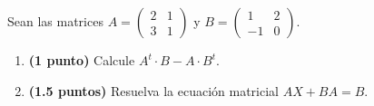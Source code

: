 
Sean las matrices $A=\begin{pmatrix}2&1\\3&1\end{pmatrix}$ y $B=\begin{pmatrix}1&2\\-1&0\end{pmatrix}$.
\begin{enumerate}[label=\alph*)]
\item \textbf{(1 punto)} Calcule $A^t\cdot B-A\cdot B^t$.
\item \textbf{(1.5 puntos)} Resuelva la ecuación matricial $AX+BA=B$.
\end{enumerate}
